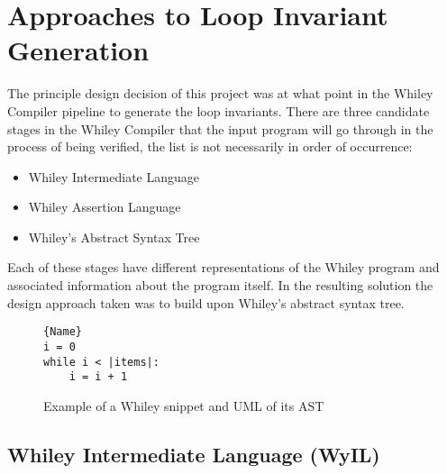 \section{Approaches to Loop Invariant Generation}

The principle design decision of this project was at
what point in the Whiley Compiler pipeline
to generate the loop invariants.
There are three candidate stages in the Whiley Compiler
that the input program will go through in the process of
being verified, the list is not necessarily in order of occurrence:

\begin{itemize}
    \item{Whiley Intermediate Language}
    \item{Whiley Assertion Language}
    \item{Whiley's Abstract Syntax Tree}
\end{itemize}

Each of these stages have different representations of the Whiley program and
associated information about the program itself.
In the resulting solution the design approach taken was to build upon
Whiley's abstract syntax tree.


\begin{figure}
\noindent\begin{minipage}{.45\textwidth}
\begin{lstlisting}[caption={Whiley Code},frame=tlrb,numbers=none]{Name}
i = 0
while i < |items|:
    i = i + 1
\end{lstlisting}
\end{minipage}\hfill
\begin{minipage}{.45\textwidth}
\end{minipage}
\caption{Example of a Whiley snippet and UML of its AST}
\label{lst:design-whiley}
\end{figure}

\subsection{Whiley Intermediate Language (WyIL)}

